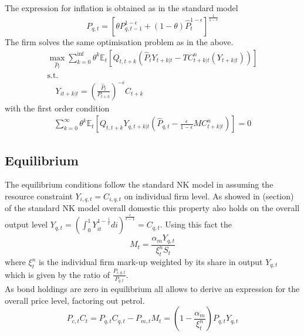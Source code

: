 \documentclass[12pt,a4paper,english]{article} %
\newcommand{\E}{\mathbb{E}} %
\begin{document}
	The expression for inflation is obtained as in the standard model
	\begin{equation}
		P_{q,t} = 
		\left[ 
		\theta P_{q,t-1}^{1 - \epsilon} + (1 - \theta) \hat{P}_t^{1 - \epsilon}
		\right]^{\frac{1}{1 - \epsilon}}
	\end{equation}
	The firm solves the same optimisation problem as in the above. 
	\begin{equation}
		\begin{aligned}
			\max_{\hat{P}_t}
			\sum_{k=0}^{\inf} \theta^k \E_t 
			\left[
			Q_{t, t+k} 
			\left(
			\hat{P}_t Y_{t+k|t} - TC_{t+k|t}^n(Y_{t+k|t})
			\right)
			\right] \\
			\textrm{s.t.}\\
			\quad
			Y_{it+k|t} = \left(\frac{\hat{P}_t}{P_{t+k}} \right)^{-\epsilon} C_{t+k}
		\end{aligned}
	\end{equation}
	with the first order condition 
	\begin{equation}
		\begin{aligned}
			\sum_{k=0}^{\infty} \theta^k \E_t 
			\left[
			Q_{t,t+k} Y_{q,t+k|t} 
			\left(
			\hat{P}_{q,t} - \frac{\epsilon}{1 - \epsilon} MC_{t+k|t}^n
			\right)
			\right]
			= 0
		\end{aligned}
	\end{equation}

	\subsection{Equilibrium}
	The equilibrium conditions follow the standard NK model in assuming the resource constraint $Y_{i,q,t} = C_{i,q,t}$ on individual firm level. As showed in (section) of the standard NK model overall domestic this property also holds on the overall output level $Y_{q,t} = \left( \int_{0}^{1} Y_{it}^{1-\frac{1}{\epsilon}} di \right)^{\frac{\epsilon}{\epsilon - 1}} = C_{q,t}$.	
	Using this fact the 
	\begin{equation}
		M_t = \frac{\alpha_m Y_{q,t}}{\xi_{t}^n S_t}
	\end{equation}
	where $\xi_t^n$ is the individual firm mark-up weighted by its share in output $Y_{q,t}$ which is given by the ratio of $\frac{P_{i,q,t}}{P_{q,t}}$. \\
	As bond holdings are zero in equilibrium all  allows to derive an expression for the overall price level, factoring out petrol.
	\begin{equation}
		P_{c,t}C_t = P_{q,t} C_{q,t} - P_{m,t}M_t = \left(1 - \frac{\alpha_m}{\xi_t^n} \right) P_{q,t} Y_{q,t}
	\end{equation}
	
\end{document}
